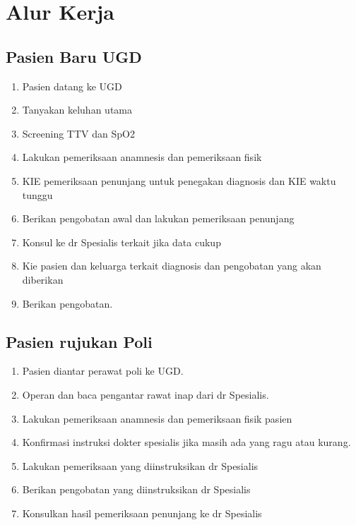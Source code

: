 \documentclass[
]{book}
\providecommand{\tightlist}{%
  \setlength{\itemsep}{0pt}\setlength{\parskip}{0pt}}
\begin{document}
\hypertarget{cross}{%
\chapter{Alur Kerja}\label{cross}}

\hypertarget{pasien-baru-ugd}{%
\section{Pasien Baru UGD}\label{pasien-baru-ugd}}

\begin{enumerate}
\def\labelenumi{\arabic{enumi}.}
\tightlist
\item
  Pasien datang ke UGD
\item
  Tanyakan keluhan utama
\item
  Screening TTV dan SpO2
\item
  Lakukan pemeriksaan anamnesis dan pemeriksaan fisik
\item
  KIE pemeriksaan penunjang untuk penegakan diagnosis dan KIE waktu tunggu
\item
  Berikan pengobatan awal dan lakukan pemeriksaan penunjang
\item
  Konsul ke dr Spesialis terkait jika data cukup
\item
  Kie pasien dan keluarga terkait diagnosis dan pengobatan yang akan diberikan
\item
  Berikan pengobatan.
\end{enumerate}

\hypertarget{pasien-rujukan-poli}{%
\section{Pasien rujukan Poli}\label{pasien-rujukan-poli}}

\begin{enumerate}
\def\labelenumi{\arabic{enumi}.}
\tightlist
\item
  Pasien diantar perawat poli ke UGD.
\item
  Operan dan baca pengantar rawat inap dari dr Spesialis.
\item
  Lakukan pemeriksaan anamnesis dan pemeriksaan fisik pasien
\item
  Konfirmasi instruksi dokter spesialis jika masih ada yang ragu atau kurang.
\item
  Lakukan pemeriksaan yang diinstruksikan dr Spesialis
\item
  Berikan pengobatan yang diinstruksikan dr Spesialis
\item
  Konsulkan hasil pemeriksaan penunjang ke dr Spesialis
\end{enumerate}
\end{document}
